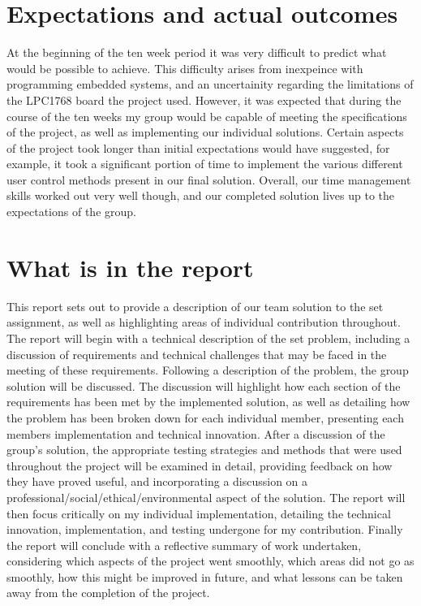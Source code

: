 \section{Expectations and actual outcomes}
At the beginning of the ten week period it was very difficult to predict what 
would be possible to achieve. This difficulty arises from inexpeince with 
programming embedded systems, and an uncertainity regarding the limitations 
of the LPC1768 board the project used. However, it was expected that during the 
course of the ten weeks my group would be capable of meeting the specifications
of the project, as well as implementing our individual solutions. Certain 
aspects of the project took longer than initial expectations would have 
suggested, for example, it took a significant portion of time to implement the 
various different user control methods present in our final solution. Overall, 
our time management skills worked out very well though, and our completed 
solution lives up to the expectations of the group. 

\section{What is in the report}
This report sets out to provide a description of our team solution to the set 
assignment, as well as highlighting areas of individual contribution throughout.
The report will begin with a technical description of the set problem, 
including a discussion of requirements and technical challenges that may be 
faced in the meeting of these requirements. 
Following a description of the problem, the group solution will be discussed. 
The discussion will highlight how each section of the requirements has been met 
by the implemented solution, as well as detailing how the problem has been broken 
down for each individual member, presenting each members implementation and 
technical innovation. 
After a discussion of the group's solution, the appropriate testing strategies 
and methods that were used throughout the project will be examined in detail, 
providing feedback on how they have proved useful, and incorporating a 
discussion on a professional/social/ethical/environmental aspect of the solution.
The report will then focus critically on my individual implementation, 
detailing the technical innovation, implementation, and testing undergone for my 
contribution. 
Finally the report will conclude with a reflective summary of work 
undertaken, considering which aspects of the project went smoothly, which areas
did not go as smoothly, how this might be improved in future, and what lessons 
can be taken away from the completion of the project. 
